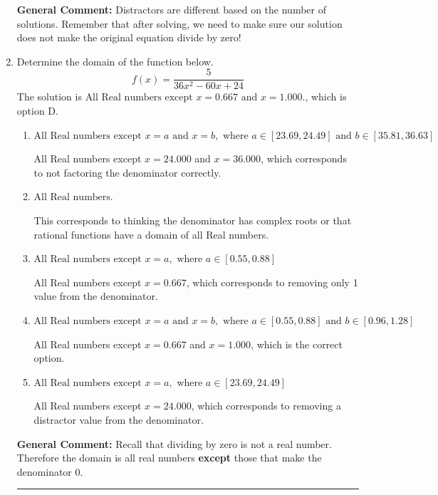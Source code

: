 \documentclass{extbook}[14pt]
\newcommand{\litem}[1]{\item #1

\rule{\textwidth}{0.4pt}}
\begin{document}
\begin{enumerate}
{\textbf{General Comment:} Distractors are different based on the number of solutions. Remember that after solving, we need to make sure our solution does not make the original equation divide by zero!
}
\litem{
Determine the domain of the function below.
\[ f(x) = \frac{5}{36x^{2} -60 x + 24} \]The solution is \( \text{All Real numbers except } x = 0.667 \text{ and } x = 1.000. \), which is option D.\begin{enumerate}[label=\Alph*.]
\item \( \text{All Real numbers except } x = a \text{ and } x = b, \text{ where } a \in [23.69, 24.49] \text{ and } b \in [35.81, 36.63] \)

All Real numbers except $x = 24.000$ and $x = 36.000$, which corresponds to not factoring the denominator correctly.
\item \( \text{All Real numbers.} \)

This corresponds to thinking the denominator has complex roots or that rational functions have a domain of all Real numbers.
\item \( \text{All Real numbers except } x = a, \text{ where } a \in [0.55, 0.88] \)

All Real numbers except $x = 0.667$, which corresponds to removing only 1 value from the denominator.
\item \( \text{All Real numbers except } x = a \text{ and } x = b, \text{ where } a \in [0.55, 0.88] \text{ and } b \in [0.96, 1.28] \)

All Real numbers except $x = 0.667$ and $x = 1.000$, which is the correct option.
\item \( \text{All Real numbers except } x = a, \text{ where } a \in [23.69, 24.49] \)

All Real numbers except $x = 24.000$, which corresponds to removing a distractor value from the denominator.
\end{enumerate}

\textbf{General Comment:} Recall that dividing by zero is not a real number. Therefore the domain is all real numbers \textbf{except} those that make the denominator 0.
}
\end{enumerate}
\end{document}
